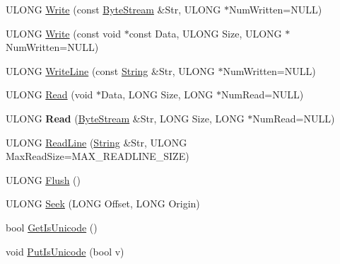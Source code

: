 \begin{DoxyCompactItemize}
\item 
U\+L\+O\+NG \hyperlink{class_canberra_1_1_utility_1_1_core_1_1_file_a50a22791ec993eee5974d942d54b3f5e_a50a22791ec993eee5974d942d54b3f5e}{Write} (const \hyperlink{class_canberra_1_1_utility_1_1_core_1_1_byte_stream}{Byte\+Stream} \&Str, U\+L\+O\+NG $\ast$Num\+Written=N\+U\+LL)
\item 
U\+L\+O\+NG \hyperlink{class_canberra_1_1_utility_1_1_core_1_1_file_a2ff9ae175a2a9d7129ed75828a5ce805_a2ff9ae175a2a9d7129ed75828a5ce805}{Write} (const void $\ast$const Data, U\+L\+O\+NG Size, U\+L\+O\+NG $\ast$Num\+Written=N\+U\+LL)
\item 
U\+L\+O\+NG \hyperlink{class_canberra_1_1_utility_1_1_core_1_1_file_af4fdd54b2bd049c5a00d0831a66e0c77_af4fdd54b2bd049c5a00d0831a66e0c77}{Write\+Line} (const \hyperlink{class_canberra_1_1_utility_1_1_core_1_1_string}{String} \&Str, U\+L\+O\+NG $\ast$Num\+Written=N\+U\+LL)
\item 
U\+L\+O\+NG \hyperlink{class_canberra_1_1_utility_1_1_core_1_1_file_a18578796ff3634bd07d90d22ffb82b7d_a18578796ff3634bd07d90d22ffb82b7d}{Read} (void $\ast$Data, L\+O\+NG Size, L\+O\+NG $\ast$Num\+Read=N\+U\+LL)
\item 
\mbox{\label{class_canberra_1_1_utility_1_1_core_1_1_file_a778f76c113e2fd34994d14ccf6d6b4ba}} 
U\+L\+O\+NG {\bfseries Read} (\hyperlink{class_canberra_1_1_utility_1_1_core_1_1_byte_stream}{Byte\+Stream} \&Str, L\+O\+NG Size, L\+O\+NG $\ast$Num\+Read=N\+U\+LL)
\item 
U\+L\+O\+NG \hyperlink{class_canberra_1_1_utility_1_1_core_1_1_file_a13bb46328a3166eba497652b6d7d25a9_a13bb46328a3166eba497652b6d7d25a9}{Read\+Line} (\hyperlink{class_canberra_1_1_utility_1_1_core_1_1_string}{String} \&Str, U\+L\+O\+NG Max\+Read\+Size=M\+A\+X\+\_\+\+R\+E\+A\+D\+L\+I\+N\+E\+\_\+\+S\+I\+ZE)
\item 
U\+L\+O\+NG \hyperlink{class_canberra_1_1_utility_1_1_core_1_1_file_ae4049e5cb4d9107a5a3df2548511fb10_ae4049e5cb4d9107a5a3df2548511fb10}{Flush} ()
\item 
U\+L\+O\+NG \hyperlink{class_canberra_1_1_utility_1_1_core_1_1_file_a534c906d5b1c4788048ad5b7da3d02a7_a534c906d5b1c4788048ad5b7da3d02a7}{Seek} (L\+O\+NG Offset, L\+O\+NG Origin)
\item 
bool \hyperlink{class_canberra_1_1_utility_1_1_core_1_1_file_a4042e135db85e44810d0830567b036c4_a4042e135db85e44810d0830567b036c4}{Get\+Is\+Unicode} ()
\item 
void \hyperlink{class_canberra_1_1_utility_1_1_core_1_1_file_a0791b6bdb260071bbd22b7a3439f80cd_a0791b6bdb260071bbd22b7a3439f80cd}{Put\+Is\+Unicode} (bool v)
\end{DoxyCompactItemize}
